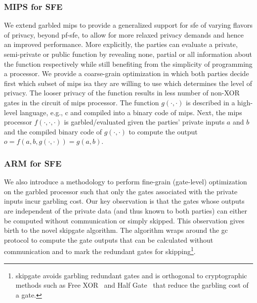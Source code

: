 \subsubsection{MIPS for SFE}
We extend garbled \gls{mips} to provide a generalized support for \acrshort{sfe} of varying flavors of privacy, beyond \acrshort{pf-sfe}, to allow for more relaxed privacy demands and hence an improved performance.
More explicitly, the parties can evaluate a private, semi-private or public function by revealing none, partial or all information about the function respectively while still benefiting from the simplicity of programming a processor.
We provide a coarse-grain optimization in which both parties decide first which subset of \gls{mips} \acrfull{isa} they are willing to use which determines the level of privacy.
The looser privacy of the function results in less number of non-XOR gates in the circuit of \gls{mips} processor.
The function $g(\cdot,\cdot)$ is described in a high-level language, e.g., \gls{c} and compiled into a binary code of \gls{mips}.
Next, the \gls{mips} processor $f(\cdot, \cdot, \cdot)$ is garbled/evaluated given the parties' private inputs $a$ and $b$ and the compiled binary code of $g(\cdot,\cdot)$ to compute the output $o = f(a, b, g(\cdot,\cdot)) = g(a,b)$.

\subsubsection{ARM for SFE}
We also introduce a methodology to perform fine-grain (gate-level) optimization on the garbled processor such that only the gates associated with the private inputs incur garbling cost.
Our key observation is that the gates whose outputs are independent of the private data (and thus known to both parties) can either be computed without communication or simply skipped.
This observation gives birth to the novel \gls{skipgate} algorithm.
The algorithm wraps around the \acrshort{gc} protocol to compute the gate outputs that can be calculated without communication and to mark the redundant gates for skipping\footnote{\gls{skipgate} avoids garbling redundant gates and is orthogonal to cryptographic methods such as Free XOR~\cite{kolesnikov2008improved} and Half Gate~\cite{zahur2015two} that reduce the garbling cost of a gate.}.

